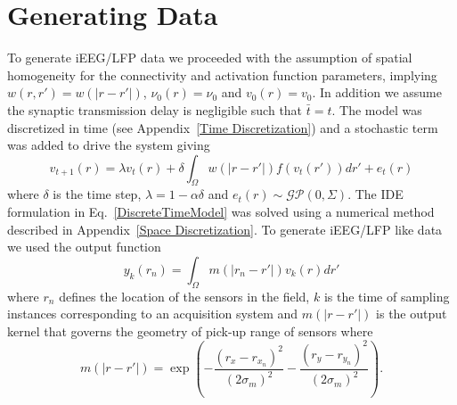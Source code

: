 \documentclass[onecolumn,draftcls]{IEEEtran}
\begin{document}
\section{Generating Data}
To generate iEEG/LFP data we proceeded with the assumption of spatial homogeneity for the connectivity and activation function parameters, implying $w(r,r') = w\left(|r-r'|\right)$, $\nu_0(r) = \nu_0$ and $v_0(r) = v_0$. In addition we assume the synaptic transmission delay is negligible such that $\bar{t}=t$. The model was discretized in time  (see Appendix~\ref{Time Discretization}) and a stochastic term was added to drive the system giving
\begin{equation}\label{DiscreteTimeModel}
	v_{t+1}\left(r\right) = \lambda v_t\left(r\right) + \delta \int_\Omega { w\left(|r-r'|\right) f\left(v_t\left(r'\right)\right) dr'} + e_t\left(r\right)
\end{equation}
where $\delta$ is the time step, $\lambda = 1-\alpha\delta$ and $e_t(r) \sim \mathcal{GP}(0,\Sigma)$. The IDE formulation in Eq.~\ref{DiscreteTimeModel} was solved using a numerical method described in Appendix~\ref{Space Discretization}. To generate iEEG/LFP like data we used the output function 
\begin{equation}
	y_{k}\left(r_n\right) = \int_{\Omega}{m\left(|r_n-r'|\right)v_{k}\left(r\right)dr'}
\end{equation}
where $r_n$ defines the location of the sensors in the field, $k$ is the time of sampling instances corresponding to an acquisition system and $m(|r-r'|)$ is the output kernel that governs the geometry of pick-up range of sensors where
\begin{equation}
	m\left(|r-r'|\right) = \exp{\left(-\frac{\left(r_x - r_{x_n}\right)^2}{\left(2\sigma_m\right)^2}-\frac{\left(r_y - r_{y_n}\right)^2}{\left(2\sigma_m\right)^2}\right)}.
\end{equation}
\end{document}
